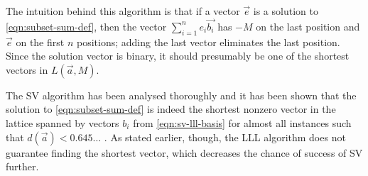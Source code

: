 The intuition behind this algorithm is that if a vector $\vec{e}$ is a
solution to \eqref{eqn:subset-sum-def}, then the vector $\sum_{i=1}^n e_i
\vec{b_i}$ has $-M$ on the last position and $\vec{e}$ on the first $n$
positions; adding the last vector eliminates the last position. Since the
solution vector is binary, it should presumably be one of the shortest
vectors in $L(\vec{a}, M)$.

The SV algorithm has been analysed thoroughly and it has been shown that
the solution to \eqref{eqn:subset-sum-def} is indeed the shortest nonzero
vector in the lattice spanned by vectors $b_i$ from
\eqref{eqn:sv-lll-basis} for almost all instances such that $d(\vec{a}) <
0.645\dots$ \cite{lagarias-odlyzko, sv-improved}. As stated earlier,
though, the LLL algorithm does not guarantee finding the shortest vector,
which decreases the chance of success of SV further.

